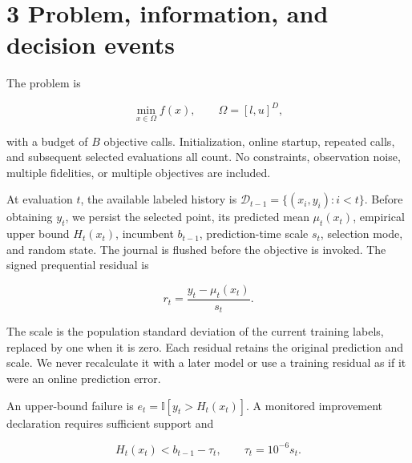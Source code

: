 \documentclass[11pt,a4paper]{article}
\begin{document}
\par{}\noindent\begin{minipage}{\linewidth}

\hypertarget{problem-information-and-decision-events}{%
\section{3 Problem, information, and decision
events}\label{problem-information-and-decision-events}}

The problem is

\[\min_{x\in\Omega}f(x),\qquad\Omega=[l,u]^D,\]

\end{minipage}\par

with a budget of \(B\) objective calls. Initialization, online startup,
repeated calls, and subsequent selected evaluations all count. No
constraints, observation noise, multiple fidelities, or multiple
objectives are included.

\par\noindent\begin{minipage}{\linewidth}

At evaluation \(t\), the available labeled history is
\(\mathcal D_{t-1}=\{(x_i,y_i):i<t\}\). Before obtaining \(y_t\), we
persist the selected point, its predicted mean \(\mu_t(x_t)\), empirical
upper bound \(H_t(x_t)\), incumbent \(b_{t-1}\), prediction-time scale
\(s_t\), selection mode, and random state. The journal is flushed before
the objective is invoked. The signed prequential residual is

\[r_t=\frac{y_t-\mu_t(x_t)}{s_t}.\]

\end{minipage}\par

The scale is the population standard deviation of the current training
labels, replaced by one when it is zero. Each residual retains the
original prediction and scale. We never recalculate it with a later
model or use a training residual as if it were an online prediction
error.

\par\noindent\begin{minipage}{\linewidth}

An upper-bound failure is \(e_t=\mathbb I[y_t>H_t(x_t)]\). A monitored
improvement declaration requires sufficient support and

\[H_t(x_t)<b_{t-1}-\tau_t,\qquad\tau_t=10^{-6}s_t.\]

\end{minipage}\par
\end{document}

